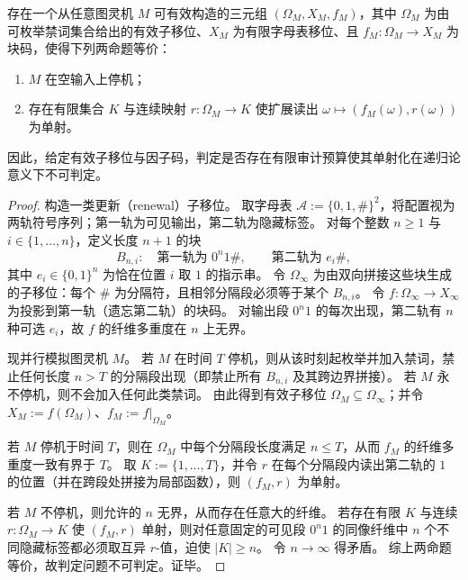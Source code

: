 \begin{theorem}[有限审计预算单射化在有效子移位因子码类上不可判定]\label{thm:pom-finite-audit-budget-factorcode-undecidable}
存在一个从任意图灵机 \(M\) 可有效构造的三元组 \((\Omega_M,X_M,f_M)\)，其中 \(\Omega_M\) 为由可枚举禁词集合给出的有效子移位、\(X_M\) 为有限字母表移位、且 \(f_M:\Omega_M\to X_M\) 为块码，使得下列两命题等价：
\begin{enumerate}
  \item \(M\) 在空输入上停机；
  \item 存在有限集合 \(K\) 与连续映射 \(r:\Omega_M\to K\) 使扩展读出 \(\omega\mapsto(f_M(\omega),r(\omega))\) 为单射。
\end{enumerate}
因此，给定有效子移位与因子码，判定是否存在有限审计预算使其单射化在递归论意义下不可判定。
\end{theorem}
\begin{proof}
构造一类更新（renewal）子移位。
取字母表 \(\mathcal A:=\{0,1,\#\}^2\)，将配置视为两轨符号序列；第一轨为可见输出，第二轨为隐藏标签。
对每个整数 \(n\ge 1\) 与 \(i\in\{1,\dots,n\}\)，定义长度 \(n+1\) 的块
\[
B_{n,i}:\quad
\text{第一轨为 }0^n1\#,\qquad
\text{第二轨为 }e_i\#,
\]
其中 \(e_i\in\{0,1\}^n\) 为恰在位置 \(i\) 取 \(1\) 的指示串。
令 \(\Omega_\infty\) 为由双向拼接这些块生成的子移位：每个 \(\#\) 为分隔符，且相邻分隔段必须等于某个 \(B_{n,i}\)。
令 \(f:\Omega_\infty\to X_\infty\) 为投影到第一轨（遗忘第二轨）的块码。
对输出段 \(0^n1\) 的每次出现，第二轨有 \(n\) 种可选 \(e_i\)，故 \(f\) 的纤维多重度在 \(n\) 上无界。
\par
现并行模拟图灵机 \(M\)。
若 \(M\) 在时间 \(T\) 停机，则从该时刻起枚举并加入禁词，禁止任何长度 \(n>T\) 的分隔段出现（即禁止所有 \(B_{n,i}\) 及其跨边界拼接）。
若 \(M\) 永不停机，则不会加入任何此类禁词。
由此得到有效子移位 \(\Omega_M\subseteq\Omega_\infty\)；并令 \(X_M:=f(\Omega_M)\)、\(f_M:=f|_{\Omega_M}\)。
\par
若 \(M\) 停机于时间 \(T\)，则在 \(\Omega_M\) 中每个分隔段长度满足 \(n\le T\)，从而 \(f_M\) 的纤维多重度一致有界于 \(T\)。
取 \(K:=\{1,\dots,T\}\)，并令 \(r\) 在每个分隔段内读出第二轨的 \(1\) 的位置（并在跨段处拼接为局部函数），则 \((f_M,r)\) 为单射。
\par
若 \(M\) 不停机，则允许的 \(n\) 无界，从而存在任意大的纤维。
若存在有限 \(K\) 与连续 \(r:\Omega_M\to K\) 使 \((f_M,r)\) 单射，则对任意固定的可见段 \(0^n1\) 的同像纤维中 \(n\) 个不同隐藏标签都必须取互异 \(r\)-值，迫使 \(|K|\ge n\)。
令 \(n\to\infty\) 得矛盾。
综上两命题等价，故判定问题不可判定。证毕。
\end{proof}

\endinput
